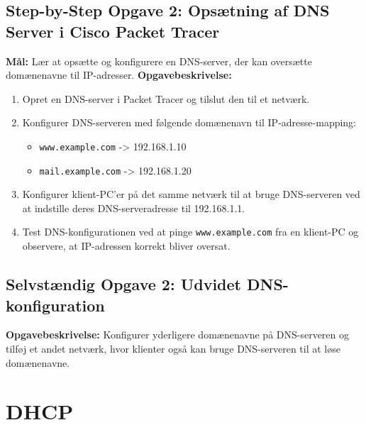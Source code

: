 \subsection*{Step-by-Step Opgave 2: Opsætning af DNS Server i Cisco Packet Tracer}
\textbf{Mål:} Lær at opsætte og konfigurere en DNS-server, der kan oversætte domænenavne til IP-adresser.
\newline\newline\noindent
\textbf{Opgavebeskrivelse:}
\begin{enumerate}
	\item Opret en DNS-server i Packet Tracer og tilslut den til et netværk.
	\item Konfigurer DNS-serveren med følgende domænenavn til IP-adresse-mapping:
	\begin{itemize}
		\item \texttt{www.example.com} -> 192.168.1.10
		\item \texttt{mail.example.com} -> 192.168.1.20
	\end{itemize}
	\item Konfigurer klient-PC'er på det samme netværk til at bruge DNS-serveren ved at indstille deres DNS-serveradresse til 192.168.1.1.
	\item Test DNS-konfigurationen ved at pinge \texttt{www.example.com} fra en klient-PC og observere, at IP-adressen korrekt bliver oversat.
\end{enumerate}

\subsection*{Selvstændig Opgave 2: Udvidet DNS-konfiguration}
\textbf{Opgavebeskrivelse:} Konfigurer yderligere domænenavne på DNS-serveren og tilføj et andet netværk, hvor klienter også kan bruge DNS-serveren til at løse domænenavne.

\section{DHCP}
